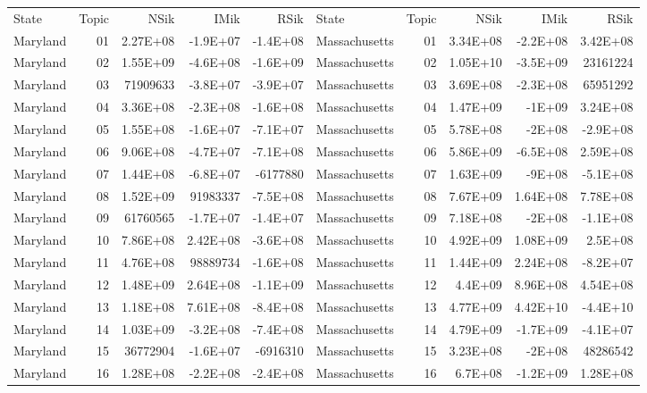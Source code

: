 \begin{table}[]
	\footnotesize
	\begin{tabular}{lrrrrlrrrr}
		State & Topic & NSik & IMik & RSik & State & Topic & NSik & IMik & RSik \\
		Maryland &  01  & 2.27E+08 & -1.9E+07 & -1.4E+08 & Massachusetts &  01  & 3.34E+08 & -2.2E+08 & 3.42E+08 \\
		Maryland &  02  & 1.55E+09 & -4.6E+08 & -1.6E+09 & Massachusetts &  02  & 1.05E+10 & -3.5E+09 & 23161224 \\
		Maryland &  03  & 71909633 & -3.8E+07 & -3.9E+07 & Massachusetts &  03  & 3.69E+08 & -2.3E+08 & 65951292 \\
		Maryland &  04  & 3.36E+08 & -2.3E+08 & -1.6E+08 & Massachusetts &  04  & 1.47E+09 & -1E+09 & 3.24E+08 \\
		Maryland &  05  & 1.55E+08 & -1.6E+07 & -7.1E+07 & Massachusetts &  05  & 5.78E+08 & -2E+08 & -2.9E+08 \\
		Maryland &  06  & 9.06E+08 & -4.7E+07 & -7.1E+08 & Massachusetts &  06  & 5.86E+09 & -6.5E+08 & 2.59E+08 \\
		Maryland &  07  & 1.44E+08 & -6.8E+07 & -6177880 & Massachusetts &  07  & 1.63E+09 & -9E+08 & -5.1E+08 \\
		Maryland &  08  & 1.52E+09 & 91983337 & -7.5E+08 & Massachusetts &  08  & 7.67E+09 & 1.64E+08 & 7.78E+08 \\
		Maryland &  09  & 61760565 & -1.7E+07 & -1.4E+07 & Massachusetts &  09  & 7.18E+08 & -2E+08 & -1.1E+08 \\
		Maryland &  10 & 7.86E+08 & 2.42E+08 & -3.6E+08 & Massachusetts &  10 & 4.92E+09 & 1.08E+09 & 2.5E+08 \\
		Maryland &  11 & 4.76E+08 & 98889734 & -1.6E+08 & Massachusetts &  11 & 1.44E+09 & 2.24E+08 & -8.2E+07 \\
		Maryland &  12 & 1.48E+09 & 2.64E+08 & -1.1E+09 & Massachusetts &  12 & 4.4E+09 & 8.96E+08 & 4.54E+08 \\
		Maryland &  13 & 1.18E+08 & 7.61E+08 & -8.4E+08 & Massachusetts &  13 & 4.77E+09 & 4.42E+10 & -4.4E+10 \\
		Maryland &  14 & 1.03E+09 & -3.2E+08 & -7.4E+08 & Massachusetts &  14 & 4.79E+09 & -1.7E+09 & -4.1E+07 \\
		Maryland &  15 & 36772904 & -1.6E+07 & -6916310 & Massachusetts &  15 & 3.23E+08 & -2E+08 & 48286542 \\
		Maryland &  16 & 1.28E+08 & -2.2E+08 & -2.4E+08 & Massachusetts &  16 & 6.7E+08 & -1.2E+09 & 1.28E+08 \\

\end{tabular}
\end{table}
